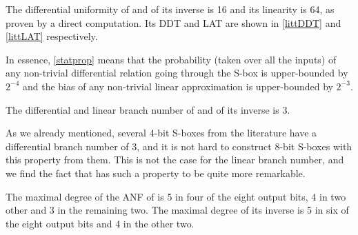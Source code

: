 \begin{prop}
\label{statprop}
The differential uniformity of \littlunOne and of its inverse is 16 and its linearity is 64, as proven by a direct computation.
Its DDT and LAT are shown in \autoref{littDDT} and \autoref{littLAT} respectively.
\end{prop}

In essence, \autoref{statprop} means that the probability (taken over all the inputs) of any non-trivial differential relation going through
the S-box is upper-bounded by $2^{-4}$ and the bias of any non-trivial linear approximation is upper-bounded by $2^{-3}$.

\begin{prop}
The differential and linear branch number of \littlunOne and of its inverse is 3.
\end{prop}

As we already mentioned, several 4-bit S-boxes from the literature have a differential branch number of 3, and it is not hard to construct
8-bit S-boxes with this property from them. This is not the case for the linear branch number, and we find the fact that \littlunOne
has such a property to be quite more remarkable.

\begin{prop}
The maximal degree of the ANF of \littlunOne is 5 in four of the eight output bits,
4 in two other and 3 in the remaining two. The maximal degree of its inverse is 5 in six of the eight output bits
and 4 in the other two.
\end{prop}



